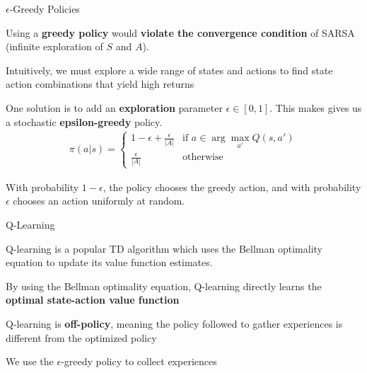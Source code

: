 \begin{frame}{$\epsilon$-Greedy Policies}

    Using a \textbf{greedy policy} would \textbf{violate the convergence condition} of SARSA (infinite exploration of $S$ and $A$). 
    \vspace{0pt}
    \blist
        \item Intuitively, we must explore a wide range of states and actions to find state action combinations that yield high returns
        \item One solution is to add an \textbf{exploration} parameter $\epsilon \in [0, 1]$. This makes gives us a stochastic \textbf{epsilon-greedy} policy.
    \elist
    \vspace{0pt}
    \begin{align*}
        \pi(a|s) = \begin{cases} 
        1 - \epsilon + \frac{\epsilon}{|A|} & \text{if } a \in \arg\max_{a'} Q(s, a') \\
        \frac{\epsilon}{|A|} & \text{otherwise} 
    \end{cases}
    \end{align*}

    \blist
        \item With probability $1-\epsilon$, the policy chooses the greedy action, and with probability $\epsilon$ chooses an action uniformly at random. 
    \elist
    
\end{frame}

\begin{frame}{Q-Learning}

    Q-learning is a popular TD algorithm which uses the Bellman optimality equation to update its value function estimates.
    \vspace{10pt}
    \blist
        \item By using the Bellman optimality equation, Q-learning directly learns the \textbf{optimal state-action value function}
        \item Q-learning is \textbf{off-policy}, meaning the policy followed to gather experiences is different from the optimized policy
        \item We use the $\epsilon$-greedy policy to collect experiences
    \elist

\end{frame}

